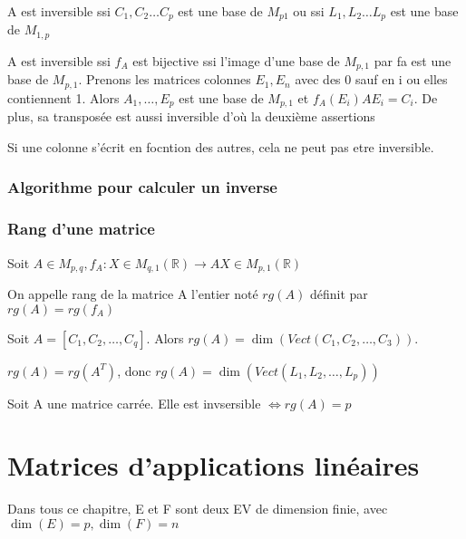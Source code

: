 \documentclass[french]{yLectureNote}
\newcommand{\R}[0]{\mathbb{R}}
\begin{document}
\begin{theorem}
 A est inversible ssi \(C_1,C_2\dots C_p\) est une base de \(M_{p1}\) ou ssi \(L_1,L_2\dots L_p\) est une base de \(M_{1,p}\)
\end{theorem}
\begin{myproof}
 A est inversible ssi \(f_A\) est bijective ssi l'image d'une base de \(M_{p,1}\) par fa est une base de \(M_{p,1}\). Prenons les matrices colonnes \(E_1,E_n\) avec des 0 sauf en i ou elles contiennent 1. Alors \(A_1,\dots, E_p\) est une base de \(M_{p,1}\) et \(f_A(E_i) AE_i = C_i\). De plus, sa transposée est aussi inversible  d'où la deuxième assertions
\end{myproof}
Si une colonne s'écrit en focntion des autres, cela ne peut pas etre inversible.
\subsection{Algorithme pour calculer un inverse}
\subsection{Rang d'une matrice}
\begin{definition}
Soit \(A\in M_{p,q}, f_A : X\in M_{q,1}(\R) \to AX \in M_{p,1}(\R)\)

On appelle rang de la matrice A l'entier noté \(rg(A)\) définit par \(rg(A) = rg(f_A)\)
\end{definition}
\begin{proposition}
Soit \(A = [C_1,C_2,\dots,C_q]\). Alors \(rg(A) = \dim(Vect(C_1,C_2,\dots,C_3))\).
\end{proposition}
\begin{theorem}
 \(rg(A) = rg(A^T)\), donc \(rg(A) = \dim(Vect(L_1,L_2,\dots, L_p))\)
\end{theorem}
\begin{proposition}
Soit A une matrice carrée. Elle est invsersible \(\iff rg(A) = p\)
\end{proposition}
\chapter{Matrices d'applications linéaires}
Dans tous ce chapitre, E et F sont deux EV de dimension finie, avec \(\dim(E) = p, \dim(F) = n\)
\end{document}

